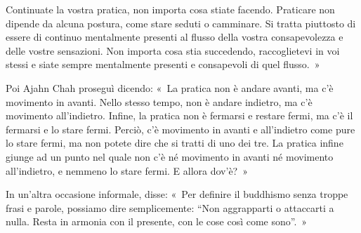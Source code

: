 Continuate la vostra pratica, non importa cosa stiate facendo. Praticare
non dipende da alcuna postura, come stare seduti o camminare. Si tratta
piuttosto di essere di continuo mentalmente presenti al flusso della
vostra consapevolezza e delle vostre sensazioni. Non importa cosa stia
succedendo, raccoglietevi in voi stessi e siate sempre mentalmente
presenti e consapevoli di quel flusso.~»

Poi Ajahn Chah proseguì dicendo: «~La pratica non è andare avanti, ma
c'è movimento in avanti. Nello stesso tempo, non è andare indietro, ma
c'è movimento all'indietro. Infine, la pratica non è fermarsi e restare
fermi, ma c'è il fermarsi e lo stare fermi. Perciò, c'è movimento in
avanti e all'indietro come pure lo stare fermi, ma non potete dire che
si tratti di uno dei tre. La pratica infine giunge ad un punto nel quale
non c'è né movimento in avanti né movimento all'indietro, e nemmeno lo
stare fermi. E allora dov'è?~»

In un'altra occasione informale, disse: «~Per definire il buddhismo
senza troppe frasi e parole, possiamo dire semplicemente: ``Non
aggrapparti o attaccarti a nulla. Resta in armonia con il presente, con
le cose così come sono''.~»

